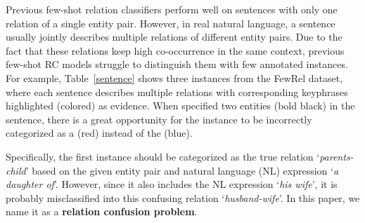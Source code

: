 \documentclass[11pt]{article}
\begin{document}
Previous few-shot relation classifiers perform well on sentences with only one relation of a single entity pair.
However, in real natural language, a sentence usually jointly describes multiple relations of different entity pairs.
Due to the fact that these relations keep high co-occurrence in the same context, previous few-shot RC models struggle to distinguish them with few annotated instances.
For example, Table~\ref{sentence} shows three instances from the FewRel dataset, where each sentence describes multiple relations with corresponding keyphrases highlighted (colored) as evidence.
When specified two entities (bold black) in the sentence, there is a great opportunity for the instance to be incorrectly categorized as a {\color{red}{confusing relation}} (red) instead of the {\color{blue}{true relation}} (blue).

Specifically, 
the first instance should be categorized as the true relation `\textit{parents-child}' based on the given entity pair and natural language (NL) expression `\textit{a daughter of}'.
However, since it also includes the NL expression `\textit{his wife}', 
it is probably misclassified into this confusing relation `\textit{husband-wife}'.
In this paper, we name it as a \textbf{relation confusion problem}.
\end{document}
